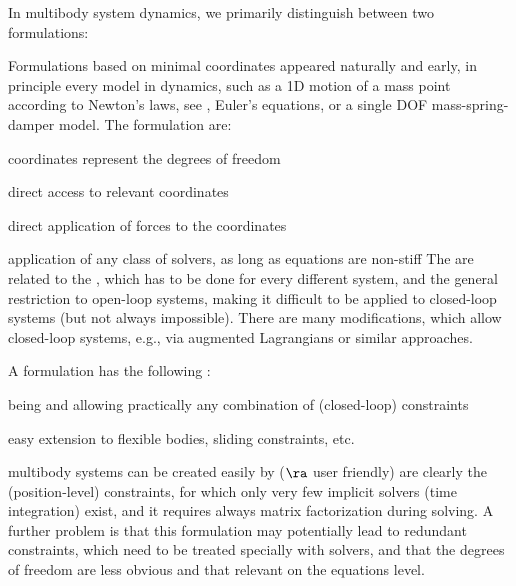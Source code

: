 %
In multibody system dynamics, we primarily distinguish between two formulations:
\bi
  \item {}
  \item {}
\ei
Formulations based on minimal coordinates appeared naturally and early, in principle every model in dynamics, 
such as a 1D motion of a mass point according to Newton's laws, see , Euler's equations, or a single DOF mass-spring-damper model. 
The  formulation are:
\bi
  \item coordinates represent the degrees of freedom
  \item direct access to relevant coordinates
  \item direct application of forces to the coordinates
  \item application of any class of solvers, as long as equations are non-stiff
\ei
The  are related to the , which has to be done for every different system,
and the general restriction to open-loop systems, making it difficult to be applied to closed-loop systems (but not always impossible). 
There are many modifications, which allow closed-loop systems, e.g., via augmented Lagrangians or similar approaches.

\noindent A  formulation has the following :
\bi
  \item being  and allowing practically any combination of (closed-loop) constraints
  \item easy extension to flexible bodies, sliding constraints, etc.
  \item multibody systems can be created easily by  ($\ra$ user friendly)
\ei
{} are clearly the  (position-level) constraints, 
for which only very few implicit solvers (time integration) exist, and it requires always matrix factorization during solving.
A further problem is that this formulation may potentially lead to redundant constraints, which need to be treated specially with solvers,
and that the degrees of freedom are less obvious and that relevant  on the equations level.


